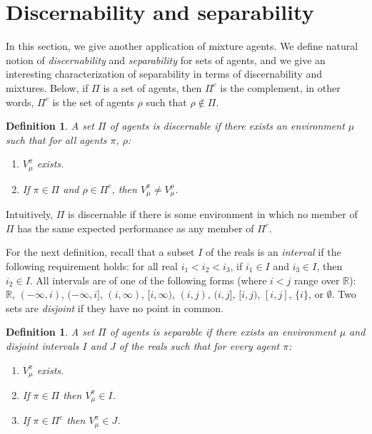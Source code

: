 \documentclass[twoside]{article}
\newtheorem{definition}[theorem]{Definition}
\begin{document}
\section{Discernability and separability}

In this section, we give another application of mixture agents.
We define natural notion of \emph{discernability} and \emph{separability}
for sets of agents,
and we give an interesting characterization of separability
in terms of discernability and mixtures.
Below, if $\Pi$ is a set of agents, then $\Pi^c$ is the complement,
in other words, $\Pi^c$ is the set of agents $\rho$ such that $\rho\not\in\Pi$.

\begin{definition}
\label{discernabilitydefn}
    A set $\Pi$ of agents is \emph{discernable} if there exists
    an environment $\mu$ such that for all agents $\pi$, $\rho$:
    \begin{enumerate}
        \item $V^\pi_\mu$ exists.
        \item If $\pi\in\Pi$ and $\rho\in\Pi^c$, then $V^\pi_\mu\not=V^\rho_\mu$.
    \end{enumerate}
\end{definition}

Intuitively, $\Pi$ is discernable if there is some environment in which
no member of $\Pi$ has the same expected performance as any member of $\Pi^c$.

For the next definition, recall that a subset $I$ of the reals
is an \emph{interval} if the following requirement holds:
for all real $i_1<i_2<i_3$, if $i_1\in I$ and $i_3\in I$, then $i_2\in I$.
All intervals are of one of the following forms (where $i<j$ range over $\mathbb R$):
$\mathbb R$, $(-\infty,i)$, $(-\infty,i]$, $(i,\infty)$, $[i,\infty)$,
$(i,j)$, $(i,j]$, $[i,j)$, $[i,j]$, $\{i\}$, or $\emptyset$.
Two sets are \emph{disjoint} if they have no point in common.

\begin{definition}
\label{incentivizabilitydefn}
    A set $\Pi$ of agents is \emph{separable} if there exists
    an environment $\mu$ and disjoint intervals $I$ and $J$ of
    the reals such that for every agent $\pi$:
    \begin{enumerate}
        \item
        $V^\pi_\mu$ exists.
        \item
        If $\pi\in \Pi$ then $V^\pi_\mu\in I$.
        \item
        If $\pi\in \Pi^c$ then $V^\pi_\mu\in J$.
    \end{enumerate}
\end{definition}
\end{document}
